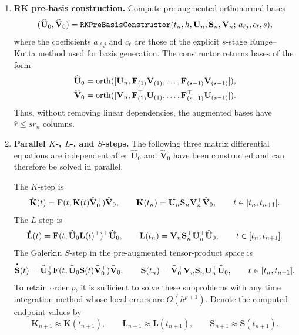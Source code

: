 \documentclass[preprint,runningheads]{svjour3}
\newcommand*{\dt}[1]{ \accentset{\mbox{\large\bfseries .}}{#1}}
\def\wh{\widehat}
\newcommand\bfF{{\mathbf F}}
\newcommand\bfK{{\mathbf K}}
\newcommand\bfL{{\mathbf L}}
\newcommand\bfS{{\mathbf S}}
\newcommand\bfU{{\mathbf U}}
\newcommand\bfV{{\mathbf V}}
\begin{document}
\begin{enumerate}
\item {\bf RK pre-basis construction.}
Compute pre-augmented orthonormal bases
\[
    (\widehat\bfU_0,\widehat\bfV_0)
    =
    {\tt RKPreBasisConstructor}
    (t_n,h,\bfU_n,\bfS_n,\bfV_n;\,a_{\ell j},c_\ell, s),
\]
where the coefficients $a_{\ell j}$ and $c_\ell$ are those of the explicit
$s$-stage Runge--Kutta method used for basis generation. The constructor returns
bases of the form
\[
\begin{aligned}
    \widehat\bfU_0
    &=
    {\rm orth}
    ([\bfU_n,\bfF_{(1)}\bfV_{(1)},\ldots,
      \bfF_{(s-1)}\bfV_{(s-1)}]), \\
    \widehat\bfV_0
    &=
    {\rm orth}
    ([\bfV_n,\bfF_{(1)}^\top\bfU_{(1)},\ldots,
      \bfF_{(s-1)}^\top\bfU_{(s-1)}]).
\end{aligned}
\]
Thus, without removing linear dependencies, the augmented bases have 
$\hat{r}\leq sr_n$ columns.  

\item {\bf Parallel $K$-, $L$-, and $S$-steps.}
The following three matrix differential equations are independent after
$\widehat\bfU_0$ and $\widehat\bfV_0$ have been constructed and can therefore be
solved in parallel.

The $K$-step is
\begin{equation}
\label{eq:parallel_bugp_K_step}
    \dt{\bfK}(t)
    =
    \bfF(t,\bfK(t)\widehat\bfV_0^\top)\widehat\bfV_0,
    \qquad
    \bfK(t_n)=\bfU_n\bfS_n\bfV_n^{\top}\wh\bfV_0,
    \qquad
    t\in[t_n,t_{n+1}].
\end{equation}
The $L$-step is
\begin{equation}
\label{eq:parallel_bugp_L_step}
    \dt{\bfL}(t)
    =
    \bfF(t,\widehat\bfU_0\bfL(t)^\top)^\top\widehat\bfU_0,
    \qquad
    \bfL(t_n)=\bfV_n\bfS_n^{\top}\bfU_n^{\top}\wh\bfU_0,
    \qquad
    t\in[t_n,t_{n+1}].
\end{equation}
The Galerkin $S$-step in the pre-augmented tensor-product space is
\begin{equation}
\label{eq:parallel_bugp_S_step}
    \dt{\bar{\bfS}}(t)
    =
    \widehat\bfU_0^\top
    \bfF(t,\widehat\bfU_0\bar{\bfS}(t)\widehat\bfV_0^\top)
    \widehat\bfV_0,
    \qquad
    \bar{\bfS}(t_n)=\wh\bfV_0^{\top}\bfV_n\bfS_n\bfU_n^{\top}\wh\bfU_0,
    \qquad
    t\in[t_n,t_{n+1}].
\end{equation}
To retain order $p$, it is sufficient to solve these subproblems
with any time integration method whose local errors are $O(h^{p+1})$. 
Denote the computed endpoint values by
\[
    \bfK_{n+1}\approx\bfK(t_{n+1}),\qquad
    \bfL_{n+1}\approx\bfL(t_{n+1}),\qquad
    \bar{\bfS}_{n+1}\approx\bar{\bfS}(t_{n+1}).
\]


\end{enumerate}
\end{document}
